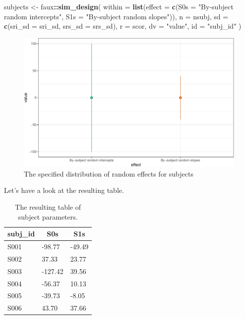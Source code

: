 \documentclass[man,floatsintext]{apa6}
\newenvironment{Shaded}{\begin{snugshade}}{\end{snugshade}}
\newcommand{\KeywordTok}[1]{\textcolor[rgb]{0.13,0.29,0.53}{\textbf{#1}}}
\newcommand{\DataTypeTok}[1]{\textcolor[rgb]{0.13,0.29,0.53}{#1}}
\newcommand{\StringTok}[1]{\textcolor[rgb]{0.31,0.60,0.02}{#1}}
\newcommand{\OperatorTok}[1]{\textcolor[rgb]{0.81,0.36,0.00}{\textbf{#1}}}
\newcommand{\NormalTok}[1]{#1}
\begin{document}
\begin{Shaded}
\begin{Highlighting}[]
\NormalTok{subjects <-}\StringTok{ }\NormalTok{faux}\OperatorTok{::}\KeywordTok{sim_design}\NormalTok{(}
  \DataTypeTok{within =} \KeywordTok{list}\NormalTok{(}\DataTypeTok{effect =} \KeywordTok{c}\NormalTok{(}\DataTypeTok{S0s =} \StringTok{"By-subject random intercepts"}\NormalTok{, }
                           \DataTypeTok{S1s =} \StringTok{"By-subject random slopes"}\NormalTok{)), }
  \DataTypeTok{n =}\NormalTok{ nsubj,}
  \DataTypeTok{sd =} \KeywordTok{c}\NormalTok{(}\DataTypeTok{sri_sd =}\NormalTok{ sri_sd, }\DataTypeTok{srs_sd =}\NormalTok{ srs_sd), }
  \DataTypeTok{r =}\NormalTok{ scor,}
  \DataTypeTok{dv =} \StringTok{"value"}\NormalTok{,}
  \DataTypeTok{id =} \StringTok{"subj_id"}
\NormalTok{)}
\end{Highlighting}
\end{Shaded}

\begin{figure}

{\centering \includegraphics[width=0.75\linewidth]{images/sim-subjects-1} 

}

\caption{The specified distribution of random effects for subjects}\label{fig:sim-subjects}
\end{figure}

Let's have a look at the resulting table.

\begin{table}[tbp]
\begin{center}
\begin{threeparttable}
\caption{\label{tab:subj-table}The resulting table of subject parameters.}
\begin{tabular}{lll}
\toprule
subj\_id & \multicolumn{1}{c}{S0s} & \multicolumn{1}{c}{S1s}\\
\midrule
S001 & -98.77 & -49.49\\
S002 & 37.33 & 23.77\\
S003 & -127.42 & 39.56\\
S004 & -56.37 & 10.13\\
S005 & -39.73 & -8.05\\
S006 & 43.70 & 37.66\\
\bottomrule
\end{tabular}
\end{threeparttable}
\end{center}
\end{table}
\end{document}
